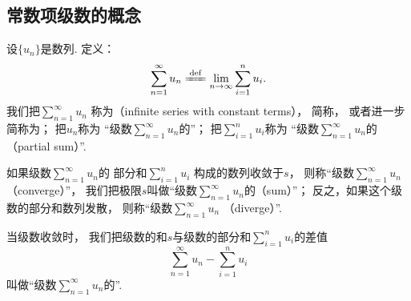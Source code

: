 \subsection{常数项级数的概念}
\begin{definition}\label{definition:无穷级数.常数项级数的定义}
设\(\{u_n\}\)是数列.
定义：\[
	\sum\limits_{n=1}^\infty u_n
	\defeq
	\lim\limits_{n\to\infty} \sum\limits_{i=1}^n u_i.
\]
我们把\(\sum\limits_{n=1}^\infty u_n\)
称为（infinite series with constant terms），
简称，
或者进一步简称为；
把\(u_n\)称为
“级数\(\sum\limits_{n=1}^\infty u_n\)的”；
把\(\sum\limits_{i=1}^n u_i\)称为
“级数\(\sum\limits_{n=1}^\infty u_n\)的（partial sum）”.

如果级数\(\sum\limits_{n=1}^\infty u_n\)的
部分和\(\sum\limits_{i=1}^n u_i\)
构成的数列收敛于\(s\)，
则称“级数\(\sum\limits_{n=1}^\infty u_n\) （converge）”，
我们把极限\(s\)叫做“级数\(\sum\limits_{n=1}^\infty u_n\)的（sum）”；
反之，如果这个级数的部分和数列发散，
则称“级数\(\sum\limits_{n=1}^\infty u_n\) （diverge）”.

当级数收敛时，
我们把级数的和\(s\)与级数的部分和\(\sum\limits_{i=1}^n u_i\)的差值\[
	\sum\limits_{n=1}^\infty u_n - \sum\limits_{i=1}^n u_i
\]
叫做“级数\(\sum\limits_{n=1}^\infty u_n\)的”.
\end{definition}

